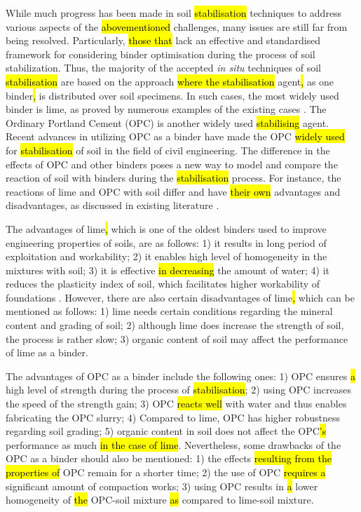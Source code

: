 \documentclass[eprint,
]{actapoly}
\begin{document}
While much progress has been made in soil \hl{stabilisation} techniques to address various aspects of the \hl{abovementioned} challenges, many issues are still far from being resolved. Particularly, \hl{those that} lack an effective and standardised framework for considering binder optimisation during the process of soil stabilization. Thus, the majority of the accepted \emph{in situ} techniques of soil \hl{stabilisation} are based on the approach \hl{where the stabilisation} agent\hl{, }as one binder\hl{, }is distributed over soil specimens. In such cases, the most widely used binder is lime, as proved by numerous examples of the existing cases \citep{Greaves,RaoThyagaraj,Rogersetal2000,ATTOHOKINE1995283,ROBIN2014211,Harichane,GlendinningRogers}. The Ordinary Portland Cement (OPC) is another widely used \hl{stabilising} agent. Recent advances in utilizing OPC as a binder \citep{Prusinski,Bhattacharjaetal2003,Lindh202201,Lindh202102,KULKARNI2022125363} have made the OPC \hl{widely used} for \hl{stabilisation} of soil in the field of civil engineering. The difference in the effects of OPC and other binders poses\hl{ }a new way to model and compare the reaction of soil with binders during the \hl{stabilisation} process. For instance, the reactions of lime and OPC with soil differ and have \hl{their own} advantages and disadvantages, as discussed in existing literature \citep{Mahedi,KOLIAS2005301,BARMAN20221319,Lindhetal2000,Chewetal2004,KOOHMISHI2022100726}. 

The advantages of lime\hl{, }which is one of the oldest binders used to improve engineering properties of soils, are as follows: 1) it results in\hl{ }long period of exploitation and workability; 2) it enables high level of homogeneity in the mixtures with soil; 3) it is effective \hl{in decreasing} the amount of water; 4) it reduces the plasticity index of soil, which facilitates higher workability of foundations \cite{LindhLemenkovaCEE}. However, there are also certain disadvantages of lime\hl{, }which can be mentioned as follows: 1) lime needs certain conditions regarding the mineral content and grading of soil; 2) although lime does increase the strength of soil, the process is rather slow; 3) organic content of soil may affect the performance of lime as a binder.

The advantages of OPC as a binder include the following ones: 1) OPC ensures \hl{a} high level of strength during the process of \hl{stabilisation}; 2) using OPC increases the speed of the strength gain; 3) OPC \hl{reacts well} with water and thus enables fabricating the OPC slurry; 4) Compared to lime, OPC has higher robustness regarding soil grading; 5) organic content in soil does not affect the OPC\hl{'s} performance as much \hl{in the case of lime}. Nevertheless, some drawbacks of the OPC as a binder should also be mentioned: 1) the effects \hl{resulting from the properties of} OPC remain for a shorter time; 2) the use of OPC \hl{requires a} significant amount of compaction works; 3) using OPC results in \hl{a} lower homogeneity of \hl{the} OPC-soil mixture\hl{ as} compared to lime-soil mixture.
\end{document}
